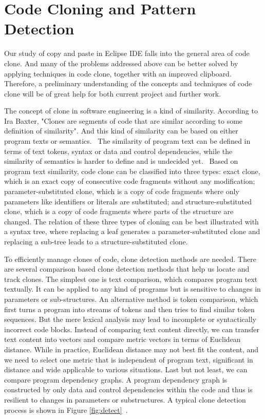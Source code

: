 \documentclass{acm_proc_article-sp}
\begin{document}
\section{Code Cloning and Pattern Detection}
Our study of copy and paste in Eclipse IDE falls into the general area of code clone. And many of the problems addressed above can be better solved by applying techniques in code clone, together with an improved clipboard. Therefore, a preliminary understanding of the concepts and techniques of code clone will be of great help for both current project and further work. 

The concept of clone in software engineering is a kind of similarity. According to Ira Baxter, "Clones are segments of code that are similar according to some definition of similarity". And this kind of similarity can be based on either program texts or semantics.~\cite{frontiers} The similarity of program text can be defined in terms of text tokens, syntax or data and control dependencies, while the similarity of semantics is harder to define and is undecided yet.~\cite{frontiers} Based on program text similarity, code clone can be classified into three types: exact clone, which is an exact copy of consecutive code fragments without any modification; parameter-substituted clone, which is a copy of code fragments where only parameters like identifiers or literals are substituted; and structure-substituted clone, which is a copy of code fragments where parts of the structure are changed. The relation of these three types of cloning can be best illustrated with a syntax tree, where replacing a leaf generates a parameter-substituted clone and replacing a sub-tree leads to a structure-substituted clone. 

To efficiently manage clones of code, clone detection methods are needed. There are several comparison based clone detection methods that help us locate and track clones. The simplest one is text comparison, which compares program text textually. It can be applied to any kind of programs but is sensitive to changes in parameters or sub-structures. An alternative method is token comparison, which first turns a program into streams of tokens and then tries to find similar token sequences. But the mere lexical analysis may lead to incomplete or syntactically incorrect code blocks. Instead of comparing text content directly, we can transfer text content into vectors and compare metric vectors in terms of Euclidean distance. While in practice, Euclidean distance may not best fit the content, and we need to select one metric that is independent of program text, significant in distance and wide applicable to various situations. Last but not least, we can compare program dependency graphs. A program dependency graph is constructed by only data and control dependencies within the code and thus is resilient to changes in parameters or substructures. A typical clone detection process is shown in Figure \ref{fig:detect}~\cite{towards_tool}.
\end{document}
